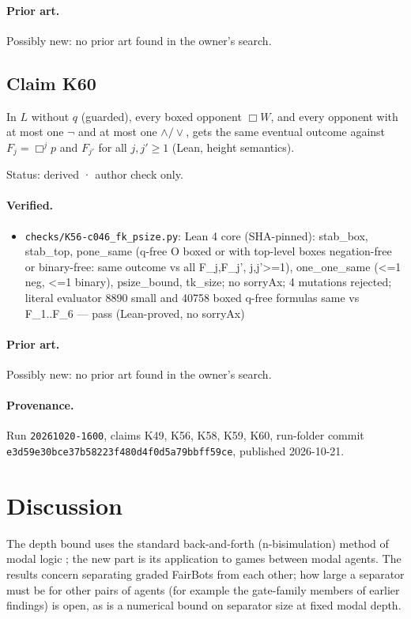 \documentclass{article}
\begin{document}
\paragraph{Prior art.} Possibly new: no prior art found in the owner's search.

\subsection*{Claim K60}

In $L$ without $q$ (guarded), every boxed opponent $\Box W$, and every opponent with at most one $\neg$ and at most one $\land/\lor$, gets the same eventual outcome against $F_j=\Box^jp$ and $F_{j'}$ for all $j,j'\ge1$ (Lean, height semantics).

Status: derived · author check only.

\paragraph{Verified.}
\begin{itemize}
\item \texttt{checks/K56-c046\_fk\_psize.py}: Lean 4 core (SHA-pinned): stab\_box, stab\_top, pone\_same (q-free O boxed or with top-level boxes negation-free or binary-free: same outcome vs all F\_j,F\_j', j,j'\textgreater{}=1), one\_one\_same (\textless{}=1 neg, \textless{}=1 binary), psize\_bound, tk\_size; no sorryAx; 4 mutations rejected; literal evaluator 8890 small and 40758 boxed q-free formulas same vs F\_1..F\_6 --- pass (Lean-proved, no sorryAx)
\end{itemize}

\paragraph{Prior art.} Possibly new: no prior art found in the owner's search.


\paragraph{Provenance.}
Run \texttt{20261020-1600}, claims K49, K56, K58, K59, K60, run-folder commit \texttt{e3d59e30bce37b58223f480d4f0d5a79bbff59ce}, published 2026-10-21.

\section{Discussion}

The depth bound uses the standard back-and-forth (n-bisimulation) method of modal logic
\cite{blackburn2001modal}; the new part is its application to games between modal agents. The
results concern separating graded FairBots from each other; how large a separator must be for
other pairs of agents (for example the gate-family members of earlier findings) is open, as is a
numerical bound on separator size at fixed modal depth.
\end{document}
